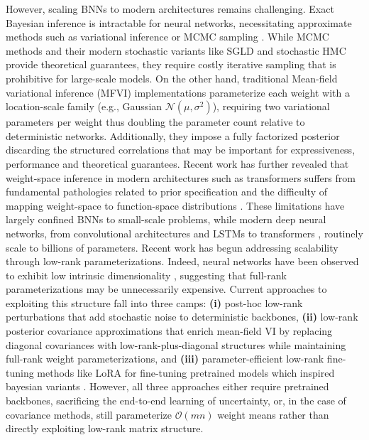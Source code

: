 \documentclass{article}
\theoremstyle{plain}
\theoremstyle{definition}
\theoremstyle{remark}
\begin{document}
However, scaling BNNs to modern architectures remains challenging. Exact Bayesian inference is intractable for neural networks, necessitating approximate methods such as variational inference \cite{peterson1987mean, hinton1993keeping, jordan1999introduction} %
or MCMC sampling \cite{neal1996bayesian}.
While MCMC methods and their modern stochastic variants like SGLD \cite{welling2011bayesian} and stochastic HMC \cite{chen2014stochastic} provide theoretical guarantees, they require costly iterative sampling that is prohibitive for large-scale models.
On the other hand, traditional Mean-field variational inference (MFVI)  implementations %
\cite{graves2011practical,kingma2014auto, blundell2015weight}  parameterize each weight with a location-scale family (e.g., Gaussian $\mathcal{N}(\mu, \sigma^2)$), requiring two variational parameters per weight thus doubling the parameter count relative to deterministic networks. Additionally, they impose a fully
factorized posterior  discarding the structured correlations that
may be important for expressiveness, performance and theoretical guarantees. Recent work has further revealed that weight-space inference in modern architectures such as 
transformers suffers from fundamental pathologies related to prior specification 
and the difficulty of mapping weight-space to function-space distributions 
\cite{cinquin2021pathologies}. 
 These limitations have largely confined BNNs to small-scale problems, while modern deep neural networks, from convolutional architectures \cite{he2016deep} and LSTMs \cite{hochreiter1997long} to transformers \cite{vaswani2017attention}, routinely scale to billions of parameters.
Recent work has begun addressing scalability through low-rank parameterizations.
Indeed, neural networks have been observed to exhibit low intrinsic dimensionality \cite{hinton1993keeping, li2018measuring, izmailov2020subspace,aghajanyan2021intrinsic}, suggesting that full-rank parameterizations may be unnecessarily expensive. Current approaches to exploiting this structure fall into three camps: \textbf{(i)} post-hoc low-rank perturbations \cite{dusenberry2020efficient, doan2025bayesian} that add stochastic noise to deterministic backbones, \textbf{(ii)} low-rank posterior covariance approximations \cite{tomczak2020efficient,swiatkowski2020ktied} that enrich mean-field VI by replacing diagonal covariances with low-rank-plus-diagonal structures while maintaining full-rank weight parameterizations, and \textbf{(iii)} parameter-efficient low-rank fine-tuning methods like LoRA \cite{hu2022lora} for fine-tuning pretrained models which inspired bayesian variants \cite{yang2024bayesian_lora,meo2024bayesian,wang2024blob}. However, all three approaches either require pretrained backbones, sacrificing the end-to-end learning of uncertainty, or, in the case of covariance methods, still parameterize $\mathcal{O}(mn)$ weight means rather than directly exploiting low-rank matrix structure. 
\end{document}

